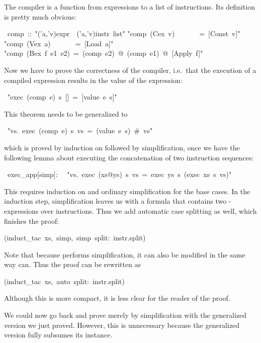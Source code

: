 \begin{isabelle}
\begin{isamarkuptext}
The compiler is a function from expressions to a list of instructions. Its
definition is pretty much obvious:%
\end{isamarkuptext}%
\ comp\ ::\ {"}('a,'v)expr\ {\isasymRightarrow}\ ('a,'v)instr\ list{"}\isanewline
{}\isanewline
{"}comp\ (Cex\ v)\ \ \ \ \ \ \ =\ [Const\ v]{"}\isanewline
{"}comp\ (Vex\ a)\ \ \ \ \ \ \ =\ [Load\ a]{"}\isanewline
{"}comp\ (Bex\ f\ e1\ e2)\ =\ (comp\ e2)\ @\ (comp\ e1)\ @\ [Apply\ f]{"}%
\begin{isamarkuptext}%
Now we have to prove the correctness of the compiler, i.e.\ that the
execution of a compiled expression results in the value of the expression:%
\end{isamarkuptext}%
\ {"}exec\ (comp\ e)\ s\ []\ =\ [value\ e\ s]{"}%
\begin{isamarkuptext}%
\noindent
This theorem needs to be generalized to%
\end{isamarkuptext}%
\ {"}{\isasymforall}vs.\ exec\ (comp\ e)\ s\ vs\ =\ (value\ e\ s)\ \#\ vs{"}%
\begin{isamarkuptxt}%
\noindent
which is proved by induction on  followed by simplification, once
we have the following lemma about executing the concatenation of two
instruction sequences:%
\end{isamarkuptxt}%
\ exec\_app[simp]:\isanewline
\ \ {"}{\isasymforall}vs.\ exec\ (xs@ys)\ s\ vs\ =\ exec\ ys\ s\ (exec\ xs\ s\ vs){"}%
\begin{isamarkuptxt}%
\noindent
This requires induction on  and ordinary simplification for the
base cases. In the induction step, simplification leaves us with a formula
that contains two -expressions over instructions. Thus we add
automatic case splitting as well, which finishes the proof:%
\end{isamarkuptxt}%
(induct\_tac\ xs,\ simp,\ simp\ split:\ instr.split)%
\begin{isamarkuptext}%
\noindent
Note that because  performs simplification, it can
also be modified in the same way  can. Thus the proof can be
rewritten as%
\end{isamarkuptext}%
(induct\_tac\ xs,\ auto\ split:\ instr.split)%
\begin{isamarkuptext}%
\noindent
Although this is more compact, it is less clear for the reader of the proof.

We could now go back and prove 
merely by simplification with the generalized version we just proved.
However, this is unnecessary because the generalized version fully subsumes
its instance.%
\end{isamarkuptext}%
\end{isabelle}%
